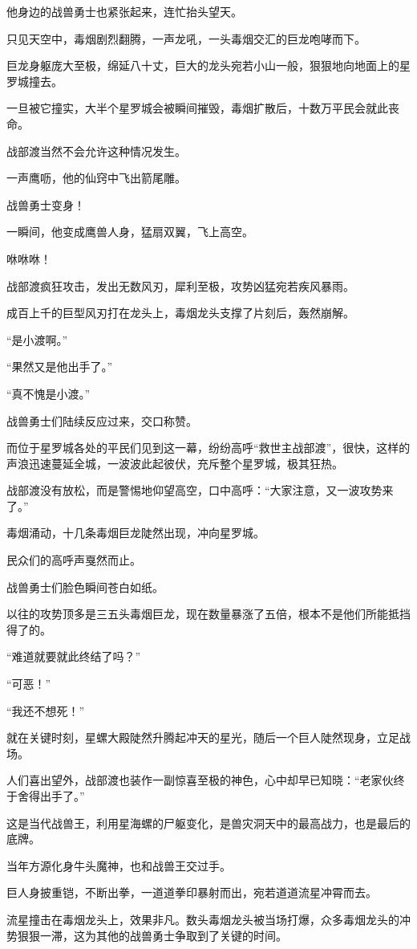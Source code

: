 \begin{this_body}
他身边的战兽勇士也紧张起来，连忙抬头望天。

只见天空中，毒烟剧烈翻腾，一声龙吼，一头毒烟交汇的巨龙咆哮而下。

巨龙身躯庞大至极，绵延八十丈，巨大的龙头宛若小山一般，狠狠地向地面上的星罗城撞去。

一旦被它撞实，大半个星罗城会被瞬间摧毁，毒烟扩散后，十数万平民会就此丧命。

战部渡当然不会允许这种情况发生。

一声鹰呖，他的仙窍中飞出箭尾雕。

战兽勇士变身！

一瞬间，他变成鹰兽人身，猛扇双翼，飞上高空。

咻咻咻！

战部渡疯狂攻击，发出无数风刃，犀利至极，攻势凶猛宛若疾风暴雨。

成百上千的巨型风刃打在龙头上，毒烟龙头支撑了片刻后，轰然崩解。

“是小渡啊。”

“果然又是他出手了。”

“真不愧是小渡。”

战兽勇士们陆续反应过来，交口称赞。

而位于星罗城各处的平民们见到这一幕，纷纷高呼“救世主战部渡”，很快，这样的声浪迅速蔓延全城，一波波此起彼伏，充斥整个星罗城，极其狂热。

战部渡没有放松，而是警惕地仰望高空，口中高呼：“大家注意，又一波攻势来了。”

毒烟涌动，十几条毒烟巨龙陡然出现，冲向星罗城。

民众们的高呼声戛然而止。

战兽勇士们脸色瞬间苍白如纸。

以往的攻势顶多是三五头毒烟巨龙，现在数量暴涨了五倍，根本不是他们所能抵挡得了的。

“难道就要就此终结了吗？”

“可恶！”

“我还不想死！”

就在关键时刻，星螺大殿陡然升腾起冲天的星光，随后一个巨人陡然现身，立足战场。

人们喜出望外，战部渡也装作一副惊喜至极的神色，心中却早已知晓：“老家伙终于舍得出手了。”

这是当代战兽王，利用星海螺的尸躯变化，是兽灾洞天中的最高战力，也是最后的底牌。

当年方源化身牛头魔神，也和战兽王交过手。

巨人身披重铠，不断出拳，一道道拳印暴射而出，宛若道道流星冲霄而去。

流星撞击在毒烟龙头上，效果非凡。数头毒烟龙头被当场打爆，众多毒烟龙头的冲势狠狠一滞，这为其他的战兽勇士争取到了关键的时间。


\end{this_body}
